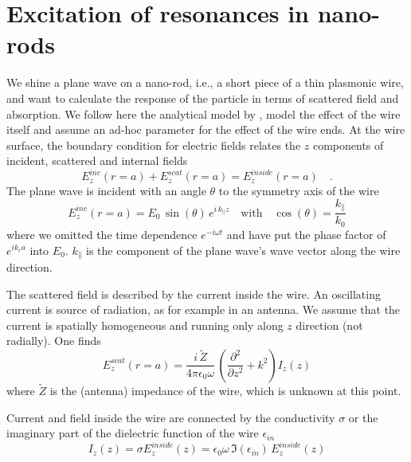 \section{Excitation of resonances in nano-rods}

We shine a plane wave on a nano-rod, i.e., a short piece of a thin plasmonic wire, and want to calculate the response of the particle in terms of scattered field and absorption. We follow here the analytical model by \cite{Dorfmueller10},  model the effect of the wire itself and assume an ad-hoc parameter for the effect of the wire ends. At the wire surface, the boundary condition for electric fields relates the $z$ components of incident, scattered and internal fields
\begin{equation}
  E_{z}^{inc}(r = a) +  E_{z}^{scat}(r = a) =  E_{z}^{inside}(r = a) \quad . \label{eq:rods_surface_field_match}
\end{equation}
The  plane wave is incident with an angle $\theta$ to the symmetry axis of the wire
\begin{equation}
  E_{z}^{inc}(r = a) = E_0 \, \sin ( \theta) \, e^{i \, k_\parallel z} \quad \text{with} \quad \cos ( \theta) = \frac{k_\parallel}{k_0}
\end{equation}
where we omitted the time dependence $e^{-i \omega t}$ and have put the phase factor of $e^{i k_r a}$ into $E_0$. $k_\parallel$ is the component of the plane wave's wave vector along the wire direction.


The scattered field is described by the current inside the wire. An oscillating current is source of radiation, as for example in an antenna. We assume that the current is spatially homogeneous and running only along $z$ direction (not radially). One finds
\begin{equation}
  E_{z}^{scat}(r = a) =  \frac{i \, \tilde{Z}}{4 \pi  \epsilon_0 \omega} \,   
  \left( \frac{\partial^2}{\partial z^2} + k^2 \right)  I_z(z)
\end{equation}
where $\tilde{Z}$ is the (antenna) impedance of the wire, which is unknown at this point.

Current and field inside the wire are connected by the conductivity $\sigma$ or the imaginary part of the dielectric function of the wire $\epsilon_{in}$
\begin{equation}
  I_z(z) = \sigma E_{z}^{inside}(z) = 
  \epsilon_0 \omega  \, \Im(\epsilon_{in}) \,  E_{z}^{inside}(z)
\end{equation}

